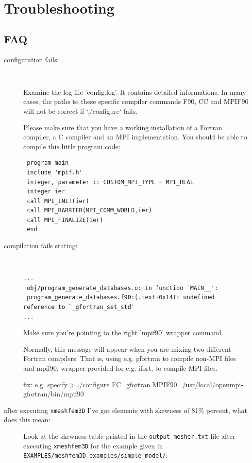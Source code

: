 \chapter{Troubleshooting}\label{cha:Troubleshooting}


\section*{FAQ}
\begin{description}
\item [{configuration fails:}]~


Examine the log file 'config.log'. It contains detailed informations.
In many cases, the paths to these specific compiler commands F90,
CC and MPIF90 will not be correct if `./configure` fails.


Please make sure that you have a working installation of a Fortran
compiler, a C compiler and an MPI implementation. You should be able
to compile this little program code:

{\footnotesize
\begin{verbatim}
 program main
 include 'mpif.h'
 integer, parameter :: CUSTOM_MPI_TYPE = MPI_REAL
 integer ier
 call MPI_INIT(ier)
 call MPI_BARRIER(MPI_COMM_WORLD,ier)
 call MPI_FINALIZE(ier)
 end
\end{verbatim}
}

\item [{compilation fails stating:}] ~
{\footnotesize
\begin{verbatim}
...
 obj/program_generate_databases.o: In function `MAIN__':
 program_generate_databases.f90:(.text+0x14): undefined reference to `_gfortran_set_std'
...
\end{verbatim}
}

Make sure you're pointing to the right 'mpif90' wrapper command.


Normally, this message will appear when you are mixing two different
Fortran compilers. That is, using e.g. gfortran to compile non-MPI
files and mpif90, wrapper provided for e.g. ifort, to compile MPI-files.


fix: e.g. specify > ./configure FC=gfortran MPIF90=/usr/local/openmpi-gfortran/bin/mpif90

\item [{after executing \texttt{xmeshfem3D} I've got elements with skewness of 81\% percent, what does this mean:}] Look
at the skewness table printed in the \texttt{output\_mesher.txt} file
after executing \texttt{xmeshfem3D} for the example given in \texttt{EXAMPLES/meshfem3D\_examples/simple\_model/}:


\end{description}
